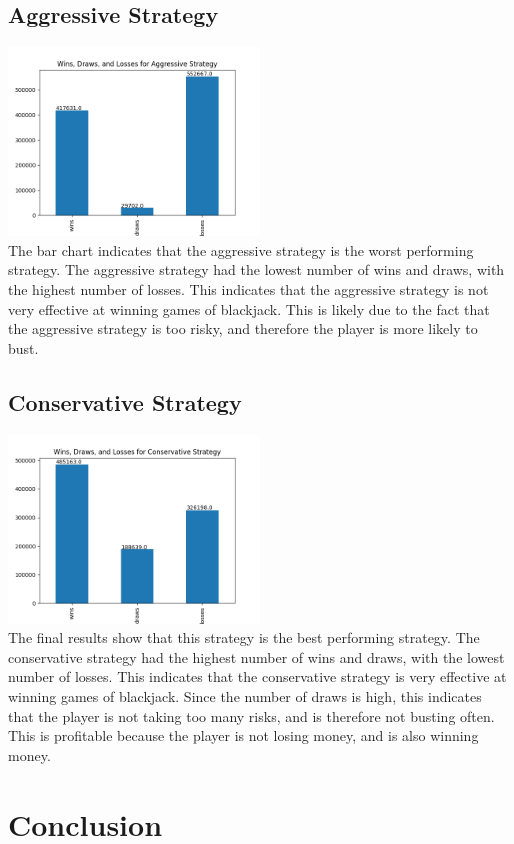 \documentclass[twocolumn]{report}
\begin{document}
\subsection{Aggressive Strategy}
\includegraphics[width=0.5\textwidth]{src/aggressive.png}\\
The bar chart indicates that the aggressive strategy is the worst performing strategy. The aggressive strategy had the lowest number of wins and draws, with the highest number of losses. This indicates that the aggressive strategy is not very effective at winning games of blackjack.
This is likely due to the fact that the aggressive strategy is too risky, and therefore the player is more likely to bust.

\subsection{Conservative Strategy}
\includegraphics[width=0.5\textwidth]{src/conservative.png}\\
The final results show that this strategy is the best performing strategy. The conservative strategy had the highest number of wins and draws, with the lowest number of losses. This indicates that the conservative strategy is very effective at winning games of blackjack.
Since the number of draws is high, this indicates that the player is not taking too many risks, and is therefore not busting often.
This is profitable because the player is not losing money, and is also winning money.


\section{Conclusion}
\end{document}
